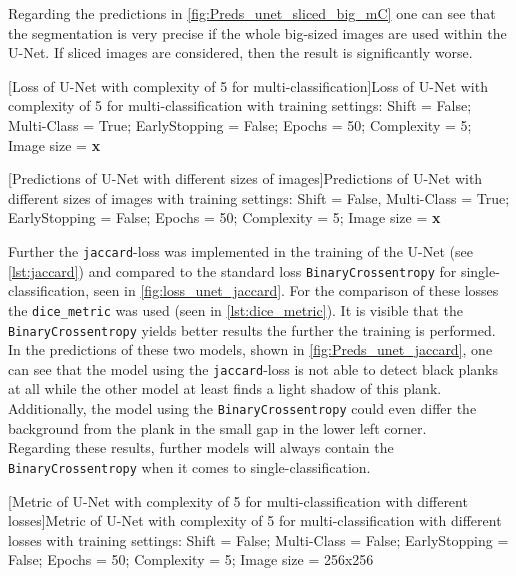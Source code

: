 Regarding the predictions in \cref{fig:Preds_unet_sliced_big_mC} 
one can see that the segmentation is very precise if the whole big-sized images are used within the U-Net. If sliced images are considered, then the result is significantly worse. \\
\begin{minipage}{\textwidth}
	
	[Loss of U-Net with complexity of 5 for multi-classification]{Loss of U-Net with complexity of 5 for multi-classification with training settings: Shift = False; Multi-Class = True; EarlyStopping = False; Epochs = 50; Complexity = 5; Image size = \textbf{x}}
	\label{fig:unet_mC_nS_bigandsliced}
	\vspace{5mm}
\end{minipage}
\begin{minipage}{\textwidth}
    \hspace{0.2cm}
	[Predictions of U-Net with different sizes of images]{Predictions of U-Net with different sizes of images with training settings: Shift = False, Multi-Class = True; EarlyStopping = False; Epochs = 50; Complexity = 5; Image size = \textbf{x}}
	\label{fig:Preds_unet_sliced_big_mC}
	\vspace{5mm}
\end{minipage}
Further the \verb|jaccard|-loss was implemented in the training of the U-Net (see \cref{lst:jaccard}) and compared to the standard loss \verb|BinaryCrossentropy| for single-classification, seen in \cref{fig:loss_unet_jaccard}. For the comparison of these losses the \verb|dice_metric| was used (seen in \cref{lst:dice_metric}). It is visible that the \verb|BinaryCrossentropy| yields better results the further the training is performed.\\
In the predictions of these two models, shown in \cref{fig:Preds_unet_jaccard}, one can see that the model using the \verb|jaccard|-loss is not able to detect black planks at all while the other model at least finds a light shadow of this plank. Additionally, the model using the \verb|BinaryCrossentropy| could even differ the background from the plank in the small gap in the lower left corner.\\
Regarding these results, further models will always contain the \verb|BinaryCrossentropy| when it comes to single-classification.\\
\begin{minipage}{\textwidth}
	
	[Metric of U-Net with complexity of 5 for multi-classification with different losses]{Metric of U-Net with complexity of 5 for multi-classification with different losses with training settings: Shift = False; Multi-Class = False; EarlyStopping = False; Epochs = 50; Complexity = 5; Image size = 256x256}
	\label{fig:loss_unet_jaccard}
	\vspace{5mm}
\end{minipage}
